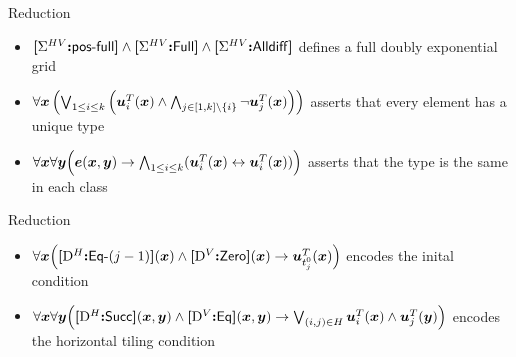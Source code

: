 \documentclass{beamer}
\begin{document}
\begin{frame}{Reduction}
\begin{itemize}
  \item
  ${\bm{[}\Sigma^{HV}\mathord{\bm{:}}\mathsf{pos}{\hbox{-}}\mathsf{full}\bm{]}}\land{\bm{[}\Sigma^{HV}\mathord{\bm{:}}\mathsf{Full}\bm{]}}\land{\bm{[}\Sigma^{HV}\mathord{\bm{:}}\mathsf{Alldiff}\bm{]}}$
  defines a full doubly exponential grid
  \item $
      \forall\bm{x} \left(\bigvee_{1 \leq i \leq k} \left(\bm{u}_{i}^{T}(\bm{x})
  \land \bigwedge_{j\in[1,k]\setminus\left\{i\right\}}
  \lnot\bm{u}_{j}^{T}(\bm{x})\right)\right)$ asserts that every element has a
  unique type
  \item $\forall\bm{x}\forall\bm{y} \Big(\bm{e}(\bm{x},\bm{y}) \rightarrow
  \bigwedge_{1 \leq i \leq k} 
  (\bm{u}_{i}^{T}(\bm{x}) \leftrightarrow \bm{u}_{i}^{T}(\bm{x}))\Big)$ asserts that the type is
  the same in each class
\end{itemize}
\end{frame}

\begin{frame}{Reduction}
\begin{itemize}
  \item $\forall\bm{x} \Big({\bm{[}{\mathrm{D}}^H\mathord{\bm{:}}\mathsf{Eq}{\hbox{-}}(j-1)\bm{]}}(\bm{x}) \land {\bm{[}{\mathrm{D}}^V\mathord{\bm{:}}\mathsf{Zero}\bm{]}}(\bm{x})
  \rightarrow \bm{u}_{t_{j}^0}^{T}(\bm{x})\Big)$ encodes the inital condition
  \item $\forall\bm{x}\forall\bm{y} \Big({\bm{[}{\mathrm{D}}^H\mathord{\bm{:}}\mathsf{Succ}\bm{]}}(\bm{x},\bm{y}) \land
  {\bm{[}{\mathrm{D}}^V\mathord{\bm{:}}\mathsf{Eq}\bm{]}}(\bm{x},\bm{y}) \rightarrow
  \bigvee_{(i,j) \in H} \bm{u}_{i}^{T}(\bm{x}) \land
  \bm{u}_{j}^{T}(\bm{y})\Big)$ encodes the horizontal tiling condition
\end{itemize}
\end{frame}
\end{document}
